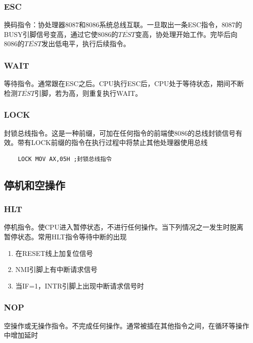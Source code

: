 \subsubsection{ESC}
换码指令：协处理器8087和8086系统总线互联。一旦取出一条ESC指令，8087的BUSY引脚信号变高，通过它使8086的$\overline{TEST}$变高，协处理开始工作。完毕后向8086的$\overline{TEST}$发出低电平，执行后续指令。
\subsubsection{WAIT}
等待指令。通常跟在ESC之后。CPU执行ESC后，CPU处于等待状态，期间不断检测$\overline{TEST}$引脚，若为高，则重复执行WAIT。
\subsubsection{LOCK}
封锁总线指令。这是一种前缀，可加在任何指令的前端使8086的总线封锁信号有效。带有LOCK前缀的指令在执行过程中将禁止其他处理器使用总线
\begin{lstlisting}
    LOCK MOV AX,05H ;封锁总线指令
\end{lstlisting}
\subsection{停机和空操作}
\subsubsection{HLT}
停机指令。使CPU进入暂停状态，不进行任何操作。当下列情况之一发生时脱离暂停状态。常用HLT指令等待中断的出现
\begin{enumerate}
    \item 在RESET线上加复位信号
    \item NMI引脚上有中断请求信号
    \item 当IF=1，INTR引脚上出现中断请求信号时
\end{enumerate}
\subsubsection{NOP}
空操作或无操作指令。不完成任何操作。通常被插在其他指令之间，在循环等操作中增加延时